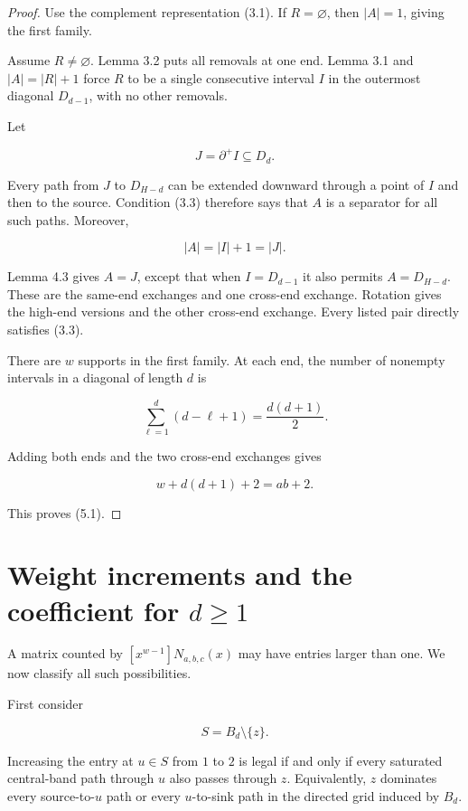 \documentclass[11pt]{article}
\numberwithin{equation}{section}
\begin{document}
\begin{proof}

Use the complement representation (3.1). If $R=\varnothing$, then
$|A|=1$, giving the first family.

Assume $R\ne\varnothing$. Lemma 3.2 puts all removals at one end.
Lemma 3.1 and $|A|=|R|+1$ force $R$ to be a single consecutive interval
$I$ in the outermost diagonal $D_{d-1}$, with no other removals.

Let

\nopagebreak[4]
\[
J=\partial^+I\subseteq D_d.
\]

Every path from $J$ to $D_{H-d}$ can be extended downward through a point
of $I$ and then to the source. Condition (3.3) therefore says that $A$ is a
separator for all such paths. Moreover,

\nopagebreak[4]
\[
|A|=|I|+1=|J|.
\]

Lemma 4.3 gives $A=J$, except that when $I=D_{d-1}$ it also permits
$A=D_{H-d}$. These are the same-end exchanges and one cross-end exchange.
Rotation gives the high-end versions and the other cross-end exchange.
Every listed pair directly satisfies (3.3).

There are $w$ supports in the first family. At each end, the number of
nonempty intervals in a diagonal of length $d$ is

\nopagebreak[4]
\[
\sum_{\ell=1}^{d}(d-\ell+1)=\frac{d(d+1)}2.
\]

Adding both ends and the two cross-end exchanges gives

\nopagebreak[4]
\[
w+d(d+1)+2=ab+2.
\]

This proves (5.1).
\end{proof}


\section{Weight increments and the coefficient for \texorpdfstring{$d\ge1$}{d >= 1}}


A matrix counted by $[x^{w-1}]N_{a,b,c}(x)$ may have entries larger than
one. We now classify all such possibilities.

First consider

\nopagebreak[4]
\[
S=B_d\setminus\{z\}.
\]

Increasing the entry at $u\in S$ from $1$ to $2$ is legal if and only if
every saturated central-band path through $u$ also passes through $z$.
Equivalently, $z$ dominates every source-to-$u$ path or every
$u$-to-sink path in the directed grid induced by $B_d$.
\end{document}
